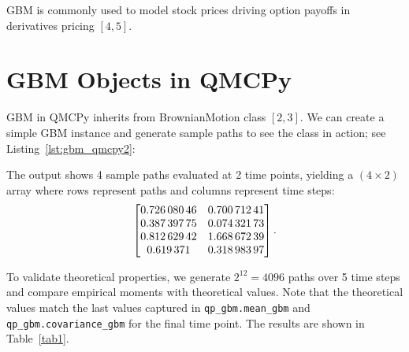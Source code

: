 \documentclass{article}
\begin{document}
GBM is commonly used to model stock prices driving option payoffs in derivatives pricing $[4, 5]$. 

\section{GBM Objects in QMCPy}

GBM in QMCPy inherits from BrownianMotion class $[2, 3]$. 
We can create a simple GBM instance and generate sample paths to see the class in action; see Listing~\ref{lst:gbm_qmcpy2}:



The output shows 4 sample paths evaluated at 2 time points, yielding a $(4 \times 2)$ array where rows represent paths and columns represent time steps:
\[
\left[
\begin{array}{@{} S[table-format=1.8] S[table-format=1.8] @{}}
\num{0.72608046} & \num{0.70071241} \\
\num{0.38739775} & \num{0.07432173} \\
\num{0.81262942} & \num{1.66867239} \\
\num{0.619371} & \num{0.31898397}
\end{array}
\right].
\]

To validate theoretical properties, we generate $2^{12} = 4096$ paths over 5 time steps and compare empirical moments with theoretical values.  Note that the theoretical values match the last values captured in \texttt{qp\_gbm.mean\_gbm} and \texttt{qp\_gbm.covariance\_gbm} for the final time point. The results are shown in Table~\ref{tab1}.

 
\end{document}
